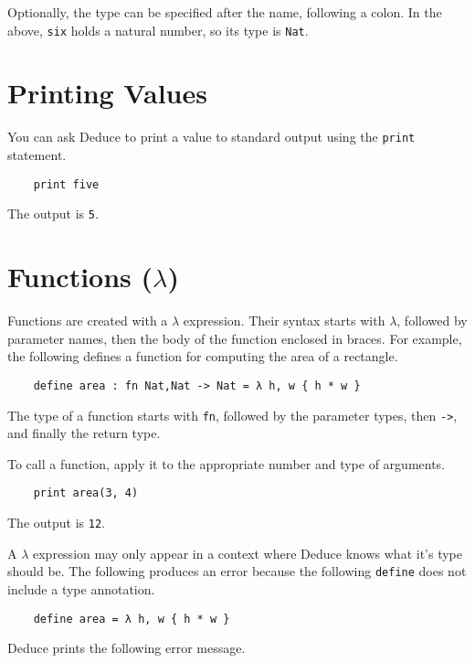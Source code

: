 \documentclass[12pt]{article}
\begin{document}
\noindent Optionally, the type can be specified after the name,
following a colon.  In the above, \texttt{six} holds a natural number,
so its type is \texttt{Nat}.

\section{Printing Values}

You can ask Deduce to print a value to standard output using the
\texttt{print} statement.

\begin{verbatim}
    print five
\end{verbatim}

\noindent The output is \texttt{5}.

\section{Functions ($\lambda$)}

Functions are created with a $\lambda$ expression.  Their syntax
starts with $\lambda$, followed by parameter names, then the body of
the function enclosed in braces.  For example, the following defines a
function for computing the area of a rectangle.

\begin{verbatim}
    define area : fn Nat,Nat -> Nat = λ h, w { h * w }
\end{verbatim}

\noindent The type of a function starts with \texttt{fn}, followed by
the parameter types, then \texttt{->}, and finally the return type.

To call a function, apply it to the appropriate number and type of
arguments.

\begin{verbatim}
    print area(3, 4)
\end{verbatim}

\noindent The output is \texttt{12}.

A $\lambda$ expression may only appear in a context where Deduce knows
what it's type should be. The following produces an error because the
following \texttt{define} does not include a type annotation.

\begin{verbatim}
    define area = λ h, w { h * w }
\end{verbatim}

\noindent Deduce prints the following error message.
\end{document}
